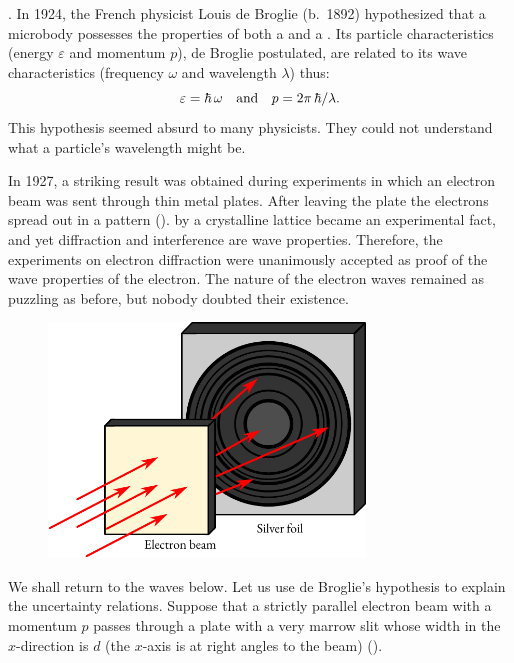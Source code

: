 . In
1924, the French physicist Louis de Broglie (b.~1892) hypothesized that
a microbody possesses the properties of both a  and a . Its particle characteristics (energy $\varepsilon$ and momentum $p$), de Broglie postulated, are related to its wave characteristics (frequency $\omega$ and wavelength $\lambda$) thus:
\begin{equation}%
\varepsilon = \hbar \, \omega \qand p = 2 \pi \, \hbar / \lambda.
\label{eq-5.4}
\end{equation}
This hypothesis seemed absurd to many physicists. They could not
understand what a particle's wavelength might be.

In 1927, a striking result was obtained during experiments in which
an electron beam was sent through thin metal plates. After leaving the
plate the electrons spread out in a  pattern ().  by a crystalline lattice became an experimental fact, and yet diffraction and interference are wave properties. Therefore, the experiments on electron diffraction were unanimously accepted as proof of the wave properties of the electron. The nature of the electron waves remained as puzzling as before, but nobody doubted their existence.

\begin{figure}[!ht]
\centering
\includegraphics[width=0.75\textwidth]{figures/diffraction-01.pdf}
\end{figure}

We shall return to the waves below. Let us use de Broglie's hypothesis
to explain the uncertainty relations. Suppose that a strictly parallel
electron beam with a momentum $p$ passes through a plate with a very
marrow slit whose width in the $x$-direction is $d$ (the $x$-axis is at right
angles to the beam) (). 

